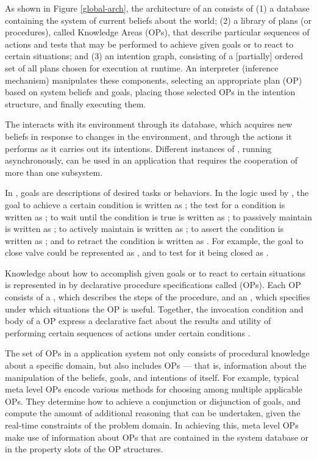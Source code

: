 
As shown in Figure \ref{global-arch}, the architecture of an \CPK{} consists of
(1) a database containing the system of current beliefs about the world; (2) a
library of plans (or procedures), called Knowledge Areas (OPs), that describe
particular sequences of actions and tests that may be performed to achieve
given goals or to react to certain situations; and (3) an intention graph,
consisting of a [partially] ordered set of all plans chosen for execution at
runtime. An interpreter (inference mechanism) manipulates these components,
selecting an appropriate plan (OP) based on system beliefs and goals, placing
those selected OPs in the intention structure, and finally executing them.

The \CPK{} interacts with its environment through its database, which
acquires new beliefs in response to changes in the environment, and through the
actions it performs as it carries out its intentions. Different instances
of \COPRS{}, running asynchronously, can be used in an application that requires
the cooperation of more than one subsystem.

In \COPRS{}, goals are descriptions of desired tasks or behaviors. In the
logic used by \COPRS{}, the goal to achieve a certain condition  is
written as ; the test for a condition  is written as ;
to wait until the condition is true is written as ; to passively
maintain  is written as ; to actively maintain  is
written as ; to assert the condition  is written as
; and to retract the condition  is written as . For example, the goal to close valve  could be represented as
, and to test for it being closed as .

Knowledge about how to accomplish given goals or to react to certain situations
is represented in \COPRS{} by declarative procedure specifications called
 (OPs). Each OP consists of a , which describes
the steps of the procedure, and an , which specifies
under which situations the OP is useful. Together, the invocation condition and
body of a OP express a declarative fact about the results and utility of
performing certain sequences of actions under certain conditions
\cite{Georgeff-Lansky86-a}.

The set of OPs in a \COPRS{} application system not only consists of procedural
knowledge about a specific domain, but also includes  OPs ---
that is, information about the manipulation of the beliefs, goals, and
intentions of \COPRS{} itself. For example, typical meta level OPs encode various
methods for choosing among multiple applicable OPs. They determine how to achieve
a conjunction or disjunction of goals, and compute the amount of additional
reasoning that can be undertaken, given the real-time constraints of the
problem domain. In achieving this, meta level OPs make use of information
about OPs that are contained in the system database or in the property slots of
the OP structures.

